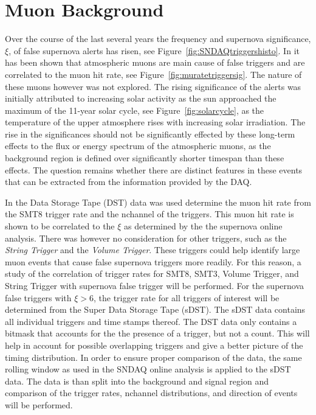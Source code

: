 \section{Muon Background}

Over the course of the last several years the frequency and supernova significance, $\xi$, of false supernova alerts has risen, see Figure~\ref{fig:SNDAQtriggershisto}. In \cite{vbaumaster} it has been shown that atmospheric muons are main cause of false triggers and are correlated to the muon hit rate, see Figure~\ref{fig:muratetriggersig}. The nature of these muons however was not explored. The rising significance of the alerts was initially attributed to increasing solar activity as the sun approached the maximum of the 11-year solar cycle, see Figure~\ref{fig:solarcycle}, as the temperature of the upper atmosphere rises with increasing solar irradiation. The rise in the significances should not be significantly effected by these long-term effects to the flux or energy spectrum of the atmospheric muons, as the background region is defined over significantly shorter timespan than these effects. The question remains whether there are distinct features in these events that can be extracted from the information provided by the DAQ. 

In \cite{vbaumaster} the Data Storage Tape (DST) data was used determine the muon hit rate from the SMT8 trigger rate and the nchannel of the triggers. This muon hit rate is shown to be correlated to the $\xi$ as determined by the the supernova online analysis. There was however no consideration for other triggers, such as the \emph{String Trigger} and the \emph{Volume Trigger}. These triggers could help identify large muon events that cause false supernova triggers more readily. For this reason, a study of the correlation of trigger rates for SMT8, SMT3, Volume Trigger, and String Trigger with supernova false trigger will be performed. For the supernova false triggers with $\xi > 6$, the trigger rate for all triggers of interest will be determined from the Super Data Storage Tape (sDST). The sDST data contains all individual triggers and time stamps thereof. The DST data only contains a bitmask that accounts for the the presence of a trigger, but not a count. This will help in account for possible overlapping triggers and give a better picture of the timing distribution. In order to ensure proper comparison of the data, the same rolling window as used in the SNDAQ online analysis is applied to the sDST data. The data is than split into the background and signal region and comparison of the trigger rates, nchannel distributions, and direction of events will be performed.

